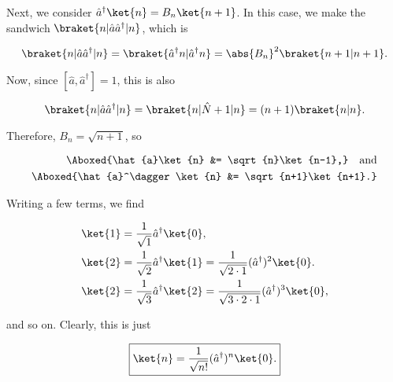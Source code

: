 \begin{parts}
  Next, we consider $\hat{a}^\dagger \ket{n} = B_n\ket{n+1}$. In this case, we make the sandwich $\braket{n | \hat{a}\hat{a}^\dagger | n}$, which is

  \begin{equation}
    \braket{n | \hat{a}\hat{a}^\dagger | n} = \braket{\hat{a}^\dagger n | \hat{a}^\dagger n} = \abs{B_n}^2\braket{n+1 | n+1}.
  \end{equation}

  Now, since $[\hat{a}, \hat{a}^\dagger] = 1$, this is also

  \begin{equation}
    \braket{n | \hat{a}\hat{a}^\dagger | n} = \braket{n | \hat{N} + 1 | n} = (n+1)\braket{n | n}.
  \end{equation}

  Therefore, $B_n = \sqrt{n+1}$, so

  \begin{align}
    \Aboxed{\hat{a}\ket{n} &= \sqrt{n}\ket{n-1},} \quad\text{and} \\
    \Aboxed{\hat{a}^\dagger \ket{n} &= \sqrt{n+1}\ket{n+1}.}
  \end{align}


\item Writing a few terms, we find

  \begin{align}
    \ket{1} &= \frac{1}{\sqrt{1}}\hat{a}^\dagger \ket{0}, \\
    \ket{2} &= \frac{1}{\sqrt{2}}\hat{a}^\dagger \ket{1} = \frac{1}{\sqrt{2 \cdot 1}}(\hat{a}^\dagger)^2\ket{0}. \\ 
    \ket{2} &= \frac{1}{\sqrt{3}}\hat{a}^\dagger \ket{2} = \frac{1}{\sqrt{3 \cdot 2 \cdot 1}}(\hat{a}^\dagger)^3\ket{0},
  \end{align}

  and so on. Clearly, this is just

  \begin{equation}
    \boxed{\ket{n} = \frac{1}{\sqrt{n!}}(\hat{a}^\dagger)^n\ket{0}.}
  \end{equation}

  
\end{parts}

